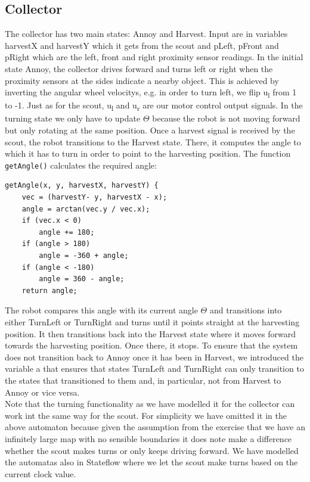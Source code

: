 \documentclass[12pt]{article}
\begin{document}
\subsection* {Collector}
The collector has two main states: Annoy and Harvest. Input are in variables harvestX and harvestY which it gets from the scout and pLeft, pFront and pRight which are the left, front and right proximity sensor readings. In the initial state Annoy, the collector drives forward and turns left or right when the proximity sensors at the sides indicate a nearby object. This is achieved by inverting the angular wheel velocitys, e.g. in order to turn left, we flip u\textsubscript{l} from 1 to -1. Just as for the scout, u\textsubscript{l} and u\textsubscript{r} are our motor control output signals. In the turning state we only have to update $\Theta$ because the robot is not moving forward but only rotating at the same position. Once a harvest signal is received by the scout, the robot transitions to the Harvest state. There, it computes the angle to which it has to turn in order to point to the harvesting position. The function \verb!getAngle()! calculates the required angle:
\begin{lstlisting}
getAngle(x, y, harvestX, harvestY) {
    vec = (harvestY- y, harvestX - x);
    angle = arctan(vec.y / vec.x);
    if (vec.x < 0) 
        angle += 180;
    if (angle > 180) 
        angle = -360 + angle;
    if (angle < -180) 
        angle = 360 - angle;
    return angle;
\end{lstlisting}
The robot compares this angle with its current angle $\Theta$  and transitions into either TurnLeft or TurnRight and turns until it points straight at the harvesting position. It then transitions back into the Harvest state where it moves forward towards the harvesting position. Once there, it stops. To ensure that the system does not transition back to Annoy once it has been in Harvest, we introduced the variable a that ensures that states TurnLeft and TurnRight can only transition to the states that transitioned to them and, in particular, not from Harvest to Annoy or vice versa.\\
Note that the turning functionality as we have modelled it for the collector can work int the same way for the scout. For simplicity we have omitted it in the above automaton because given the assumption from the exercise that we have an infinitely large map with no sensible boundaries it does note make a difference whether the scout makes turns or only keeps driving forward. We have modelled the automatas also in Stateflow where we let the scout make turns based on the current clock value.\\
\end{document}
